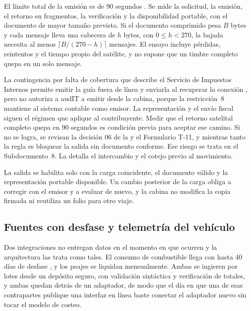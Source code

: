 El límite total de la emisión es de 90 segundos . Se mide la solicitud, la emisión,
el retorno en fragmentos, la verificación y la disponibilidad portable, con el documento de mayor tamaño
previsto. Si el documento comprimido pesa \(B\) bytes y cada mensaje lleva una cabecera de \(h\) bytes, con
\(0 \le h < 270\), la bajada necesita al menos \(\lceil B/(270-h) \rceil\) mensajes. El ensayo incluye
pérdidas, reintentos y el tiempo propio del satélite, y no supone que un timbre completo quepa en un
solo mensaje.

La contingencia por falta de cobertura que describe el Servicio de Impuestos Internos permite emitir la
guía fuera de línea y enviarla al recuperar la conexión \parencite{sii_contingencia,sii_res99_2019},
pero no autoriza a audIT a emitir desde la cabina, porque la restricción~8 mantiene al sistema contable
como emisor. La representación y el envío fiscal siguen el régimen que aplique al contribuyente. Medir que el
retorno satelital completo quepa en 90 segundos es condición previa para aceptar ese camino. Si no se logra, se revisan la decisión 06 de la  y el Formulario T-11, y
mientras tanto la regla es bloquear la salida sin documento conforme. Ese riesgo se trata en el
Subdocumento~8. La  detalla el intercambio y el cotejo previo al movimiento.


La salida se habilita solo con la carga coincidente, el documento válido y la representación portable
disponible. Un cambio posterior de la carga obliga a corregir con el emisor y a evaluar de nuevo, y la
cabina no modifica la copia firmada ni reutiliza un folio para otro viaje.

\subsection{Fuentes con desfase y telemetría del vehículo}\label{sec:4-desfase}

Dos integraciones no entregan datos en el momento en que ocurren y la arquitectura las trata como
tales. El consumo de combustible llega con hasta 40 días de desfase , y los
peajes se liquidan mensualmente. Ambas se ingieren por lotes desde un depósito seguro, con validación
sintáctica y verificación de totales, y ambas quedan detrás de un adaptador, de modo que el día en que
una de esas contrapartes publique una interfaz en línea baste conectar el adaptador nuevo sin tocar el
modelo de costeo.

